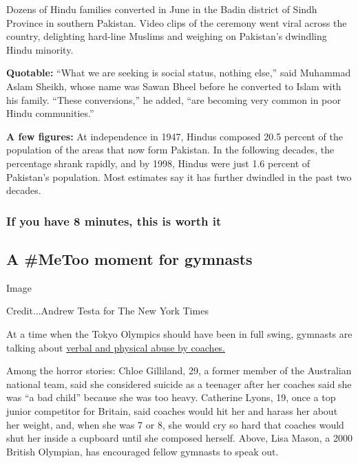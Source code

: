 Dozens of Hindu families converted in June in the Badin district of
Sindh Province in southern Pakistan. Video clips of the ceremony went
viral across the country, delighting hard-line Muslims and weighing on
Pakistan's dwindling Hindu minority.

\textbf{Quotable:} ``What we are seeking is social status, nothing
else,'' said Muhammad Aslam Sheikh, whose name was Sawan Bheel before he
converted to Islam with his family. ``These conversions,'' he added,
``are becoming very common in poor Hindu communities.''

\textbf{A few figures:} At independence in 1947, Hindus composed 20.5
percent of the population of the areas that now form Pakistan. In the
following decades, the percentage shrank rapidly, and by 1998, Hindus
were just 1.6 percent of Pakistan's population. Most estimates say it
has further dwindled in the past two decades.

\hypertarget{if-you-have-8-minutes-this-is-worth-it}{%
\subsubsection{If you have 8 minutes, this is worth
it}\label{if-you-have-8-minutes-this-is-worth-it}}

\hypertarget{a-metoo-moment-for-gymnasts}{%
\subsection{A \#MeToo moment for
gymnasts}\label{a-metoo-moment-for-gymnasts}}

Image

Credit...Andrew Testa for The New York Times

At a time when the Tokyo Olympics should have been in full swing,
gymnasts are talking about
\href{https://www.nytimes3xbfgragh.onion/2020/08/03/sports/olympics/gymnastics-abuse-athlete-a.html}{verbal
and physical abuse by coaches.}

Among the horror stories: Chloe Gilliland, 29, a former member of the
Australian national team, said she considered suicide as a teenager
after her coaches said she was ``a bad child'' because she was too
heavy. Catherine Lyons, 19, once a top junior competitor for Britain,
said coaches would hit her and harass her about her weight, and, when
she was 7 or 8, she would cry so hard that coaches would shut her inside
a cupboard until she composed herself. Above, Lisa Mason, a 2000 British
Olympian, has encouraged fellow gymnasts to speak out.

